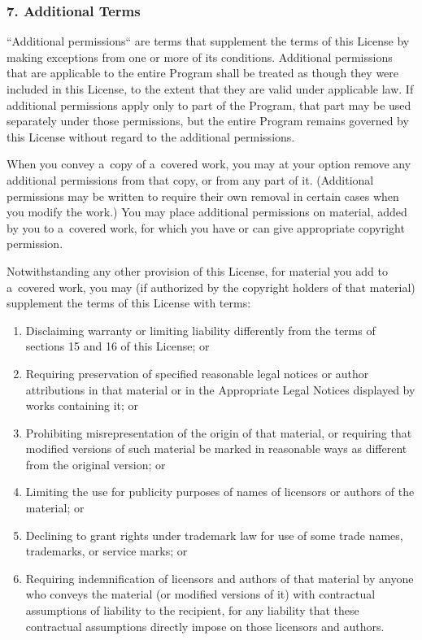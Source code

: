 \documentclass[a4paper, 11pt, twoside]{article}
\begin{document}
\subsubsection{7. Additional Terms}

“Additional permissions“ are terms that supplement the terms of this License by making exceptions from one or more of its conditions. Additional permissions that are applicable to the entire Program shall be treated as though they were included in this License, to the extent that they are valid under applicable law. If additional permissions apply only to part of the Program, that part may be used separately under those permissions, but the entire Program remains governed by this License without regard to the additional permissions.

When you convey a~copy of a~covered work, you may at your option remove any additional permissions from that copy, or from any part of it. (Additional permissions may be written to require their own removal in certain cases when you modify the work.) You may place additional permissions on material, added by you to a~covered work, for which you have or can give appropriate copyright permission.

Notwithstanding any other provision of this License, for material you add to a~covered work, you may (if authorized by the copyright holders of that material) supplement the terms of this License with terms:

\begin{enumerate}[label=\Alph*)]
\item Disclaiming warranty or limiting liability differently from the terms of sections 15 and 16 of this License; or
\item Requiring preservation of specified reasonable legal notices or author attributions in that material or in the Appropriate Legal Notices displayed by works containing it; or
\item Prohibiting misrepresentation of the origin of that material, or requiring that modified versions of such material be marked in reasonable ways as different from the original version; or
\item Limiting the use for publicity purposes of names of licensors or authors of the material; or
\item Declining to grant rights under trademark law for use of some trade names, trademarks, or service marks; or
\item Requiring indemnification of licensors and authors of that material by anyone who conveys the material (or modified versions of it) with contractual assumptions of liability to the recipient, for any liability that these contractual assumptions directly impose on those licensors and authors.
\end{enumerate}
\end{document}
